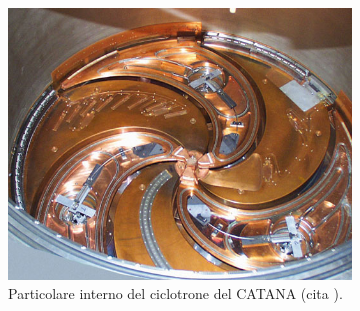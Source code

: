 \documentclass[12pt,a4paper,twoside]{report}
\begin{document}
	\begin{figure}[H]
		\centering
		\begin{subfigure}[b]{0.49\textwidth}
			\centering
			\includegraphics[width=\textwidth, scale=0.5]{images/catana1.jpg}
			\caption{Particolare interno del ciclotrone del CATANA (cita
				).}
			\label{fig:catana1}
		\end{subfigure}
		\hfill
		\begin{subfigure}[b]{0.49\textwidth}
			\centering

\end{subfigure}
\end{figure}
\end{document}
